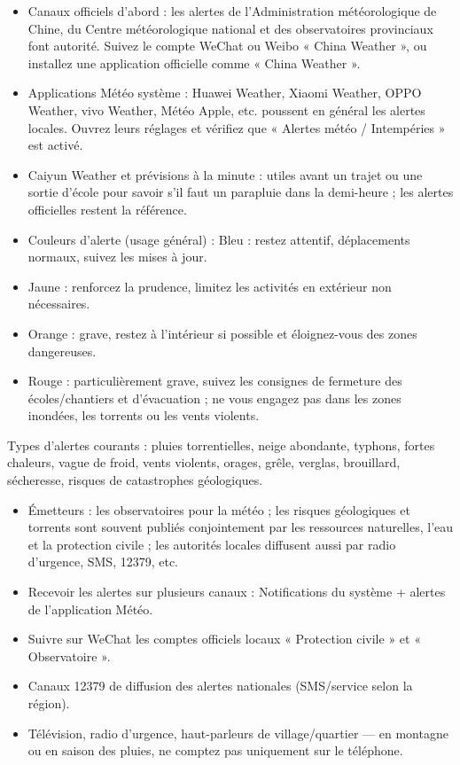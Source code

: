 \begin{itemize}
  \item Canaux officiels d'abord : les alertes de l'Administration météorologique de Chine, du Centre météorologique national et des observatoires provinciaux font autorité. Suivez le compte WeChat ou Weibo « China Weather », ou installez une application officielle comme « China Weather ».
  \item Applications Météo système : Huawei Weather, Xiaomi Weather, OPPO Weather, vivo Weather, Météo Apple, etc. poussent en général les alertes locales. Ouvrez leurs réglages et vérifiez que « Alertes météo / Intempéries » est activé.
  \item Caiyun Weather et prévisions à la minute : utiles avant un trajet ou une sortie d'école pour savoir s'il faut un parapluie dans la demi-heure ; les alertes officielles restent la référence.
  \item Couleurs d'alerte (usage général) : Bleu : restez attentif, déplacements normaux, suivez les mises à jour.
  \item Jaune : renforcez la prudence, limitez les activités en extérieur non nécessaires.
  \item Orange : grave, restez à l'intérieur si possible et éloignez-vous des zones dangereuses.
  \item Rouge : particulièrement grave, suivez les consignes de fermeture des écoles/chantiers et d'évacuation ; ne vous engagez pas dans les zones inondées, les torrents ou les vents violents.
\end{itemize}

Types d'alertes courants : pluies torrentielles, neige abondante, typhons, fortes chaleurs, vague de froid, vents violents, orages, grêle, verglas, brouillard, sécheresse, risques de catastrophes géologiques.


\begin{itemize}
  \item Émetteurs : les observatoires pour la météo ; les risques géologiques et torrents sont souvent publiés conjointement par les ressources naturelles, l'eau et la protection civile ; les autorités locales diffusent aussi par radio d'urgence, SMS, 12379, etc.
  \item Recevoir les alertes sur plusieurs canaux : Notifications du système + alertes de l'application Météo.
  \item Suivre sur WeChat les comptes officiels locaux « Protection civile » et « Observatoire ».
  \item Canaux 12379 de diffusion des alertes nationales (SMS/service selon la région).
  \item Télévision, radio d'urgence, haut-parleurs de village/quartier — en montagne ou en saison des pluies, ne comptez pas uniquement sur le téléphone.
\end{itemize}

